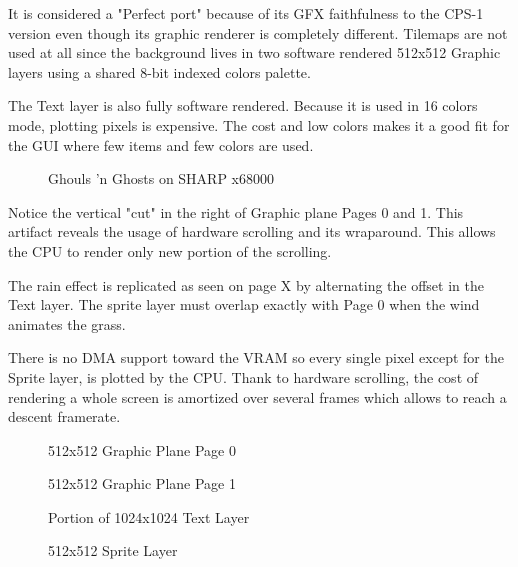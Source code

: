It is considered a "Perfect port" because of its GFX faithfulness to the CPS-1 version even though its graphic renderer is completely different. Tilemaps are not used at all since the background lives in two software rendered 512x512 Graphic layers using a shared 8-bit indexed colors palette. 

The Text layer is also fully software rendered. Because it is used in 16 colors mode, plotting pixels is expensive. The cost and low colors makes it a good fit for the GUI where few items and few colors are used.

\begin{figure}[H]
\caption*{Ghouls 'n Ghosts on SHARP x68000}
\end{figure}


Notice the vertical "cut" in the right of Graphic plane Pages 0 and 1. This artifact reveals the usage of hardware scrolling and its wraparound. This allows the CPU to render only new portion of the scrolling. 

The rain effect is replicated as seen on page X by alternating the offset in the Text layer. The sprite layer must overlap exactly with Page 0 when the wind animates the grass.

There is no DMA support toward the VRAM so every single pixel except for the Sprite layer, is plotted by the CPU. Thank to hardware scrolling, the cost of rendering a whole screen is amortized over several frames which allows to reach a descent framerate.

\vspace{-4ex}
\begin{minipage}[t]{0.49\linewidth}
  \begin{figure}[H]
  \caption*{512x512 Graphic Plane Page 0}
  \end{figure}
\end{minipage}%
\hfill
\begin{minipage}[t]{0.49\linewidth}
  \begin{figure}[H]
  \caption*{512x512 Graphic Plane Page 1}
  \end{figure}
\end{minipage}%

\begin{minipage}[t]{0.49\linewidth}
  \begin{figure}[H]
  \caption*{Portion of 1024x1024 Text Layer}
  \end{figure}
\end{minipage}%
\hfill
\begin{minipage}[t]{0.49\linewidth}
   \begin{figure}[H]
  \caption*{512x512 Sprite Layer}
  \end{figure}
\end{minipage}%


